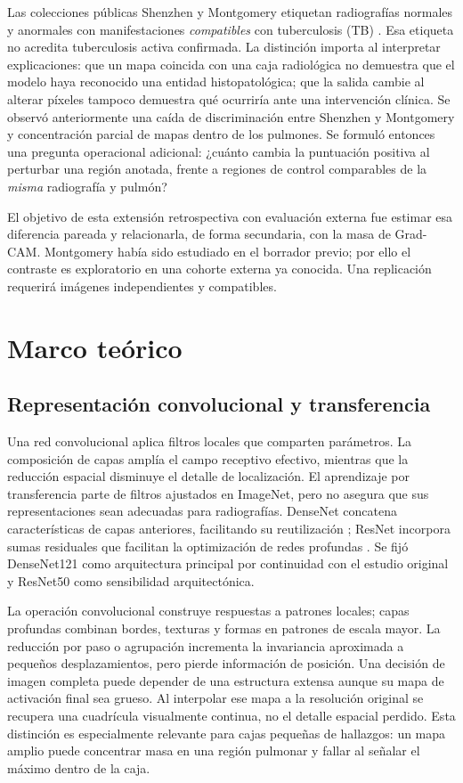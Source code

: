 \documentclass[conference]{IEEEtran}
\begin{document}
Las colecciones públicas Shenzhen y Montgomery etiquetan radiografías normales y anormales con manifestaciones \emph{compatibles} con tuberculosis (TB) \cite{jaeger2014,nlmdata}. Esa etiqueta no acredita tuberculosis activa confirmada. La distinción importa al interpretar explicaciones: que un mapa coincida con una caja radiológica no demuestra que el modelo haya reconocido una entidad histopatológica; que la salida cambie al alterar píxeles tampoco demuestra qué ocurriría ante una intervención clínica. Se observó anteriormente una caída de discriminación entre Shenzhen y Montgomery y concentración parcial de mapas dentro de los pulmones. Se formuló entonces una pregunta operacional adicional: ¿cuánto cambia la puntuación positiva al perturbar una región anotada, frente a regiones de control comparables de la \emph{misma} radiografía y pulmón?

El objetivo de esta extensión retrospectiva con evaluación externa fue estimar esa diferencia pareada y relacionarla, de forma secundaria, con la masa de Grad-CAM. Montgomery había sido estudiado en el borrador previo; por ello el contraste es exploratorio en una cohorte externa ya conocida. Una replicación requerirá imágenes independientes y compatibles.

\section{Marco teórico}
\subsection{Representación convolucional y transferencia}
Una red convolucional aplica filtros locales que comparten parámetros. La composición de capas amplía el campo receptivo efectivo, mientras que la reducción espacial disminuye el detalle de localización. El aprendizaje por transferencia parte de filtros ajustados en ImageNet, pero no asegura que sus representaciones sean adecuadas para radiografías. DenseNet concatena características de capas anteriores, facilitando su reutilización \cite{huang2017}; ResNet incorpora sumas residuales que facilitan la optimización de redes profundas \cite{he2016}. Se fijó DenseNet121 como arquitectura principal por continuidad con el estudio original y ResNet50 como sensibilidad arquitectónica.

La operación convolucional construye respuestas a patrones locales; capas profundas combinan bordes, texturas y formas en patrones de escala mayor. La reducción por paso o agrupación incrementa la invariancia aproximada a pequeños desplazamientos, pero pierde información de posición. Una decisión de imagen completa puede depender de una estructura extensa aunque su mapa de activación final sea grueso. Al interpolar ese mapa a la resolución original se recupera una cuadrícula visualmente continua, no el detalle espacial perdido. Esta distinción es especialmente relevante para cajas pequeñas de hallazgos: un mapa amplio puede concentrar masa en una región pulmonar y fallar al señalar el máximo dentro de la caja.
\end{document}
